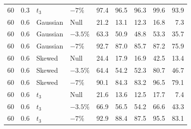 \begin{table}[H]
\begin{tabular*}{\textwidth}{@{\extracolsep{\fill}}rrllrrrrr}
60 & 0.3 & $t_3$ & $-7\%$ & 97.4 & 96.5 & 96.3 & 99.6 & 93.9 \\
60 & 0.6 & Gaussian & Null & 21.2 & 13.1 & 12.3 & 16.8 & 7.3 \\
60 & 0.6 & Gaussian & $-3.5\%$ & 63.3 & 50.9 & 48.8 & 53.3 & 35.7 \\
60 & 0.6 & Gaussian & $-7\%$ & 92.7 & 87.0 & 85.7 & 87.2 & 75.9 \\
60 & 0.6 & Skewed & Null & 24.4 & 17.9 & 16.9 & 42.5 & 13.4 \\
60 & 0.6 & Skewed & $-3.5\%$ & 64.4 & 54.2 & 52.3 & 80.7 & 46.7 \\
60 & 0.6 & Skewed & $-7\%$ & 90.1 & 84.3 & 83.2 & 96.5 & 79.1 \\
60 & 0.6 & $t_3$ & Null & 21.6 & 13.6 & 12.5 & 17.7 & 7.4 \\
60 & 0.6 & $t_3$ & $-3.5\%$ & 66.9 & 56.5 & 54.2 & 66.6 & 43.3 \\
60 & 0.6 & $t_3$ & $-7\%$ & 92.9 & 88.4 & 87.5 & 95.5 & 83.1 \\
\bottomrule
\end{tabular*}
\end{table}

